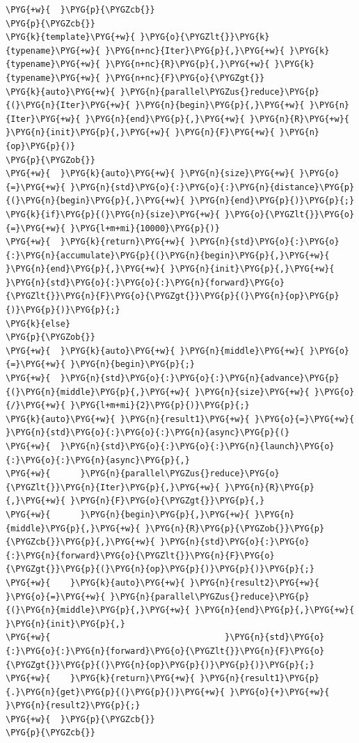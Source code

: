 \begin{codeblockbg}
\begin{Verbatim}[commandchars=\\\{\},breaklines=true,breakanywhere=true,fontsize=\codefont,xleftmargin=17bp]
\PYG{+w}{  }\PYG{p}{\PYGZcb{}}
\PYG{p}{\PYGZcb{}}
\PYG{k}{template}\PYG{+w}{ }\PYG{o}{\PYGZlt{}}\PYG{k}{typename}\PYG{+w}{ }\PYG{n+nc}{Iter}\PYG{p}{,}\PYG{+w}{ }\PYG{k}{typename}\PYG{+w}{ }\PYG{n+nc}{R}\PYG{p}{,}\PYG{+w}{ }\PYG{k}{typename}\PYG{+w}{ }\PYG{n+nc}{F}\PYG{o}{\PYGZgt{}}
\PYG{k}{auto}\PYG{+w}{ }\PYG{n}{parallel\PYGZus{}reduce}\PYG{p}{(}\PYG{n}{Iter}\PYG{+w}{ }\PYG{n}{begin}\PYG{p}{,}\PYG{+w}{ }\PYG{n}{Iter}\PYG{+w}{ }\PYG{n}{end}\PYG{p}{,}\PYG{+w}{ }\PYG{n}{R}\PYG{+w}{ }\PYG{n}{init}\PYG{p}{,}\PYG{+w}{ }\PYG{n}{F}\PYG{+w}{ }\PYG{n}{op}\PYG{p}{)}
\PYG{p}{\PYGZob{}}
\PYG{+w}{  }\PYG{k}{auto}\PYG{+w}{ }\PYG{n}{size}\PYG{+w}{ }\PYG{o}{=}\PYG{+w}{ }\PYG{n}{std}\PYG{o}{:}\PYG{o}{:}\PYG{n}{distance}\PYG{p}{(}\PYG{n}{begin}\PYG{p}{,}\PYG{+w}{ }\PYG{n}{end}\PYG{p}{)}\PYG{p}{;}
\PYG{k}{if}\PYG{p}{(}\PYG{n}{size}\PYG{+w}{ }\PYG{o}{\PYGZlt{}}\PYG{o}{=}\PYG{+w}{ }\PYG{l+m+mi}{10000}\PYG{p}{)}
\PYG{+w}{  }\PYG{k}{return}\PYG{+w}{ }\PYG{n}{std}\PYG{o}{:}\PYG{o}{:}\PYG{n}{accumulate}\PYG{p}{(}\PYG{n}{begin}\PYG{p}{,}\PYG{+w}{ }\PYG{n}{end}\PYG{p}{,}\PYG{+w}{ }\PYG{n}{init}\PYG{p}{,}\PYG{+w}{ }\PYG{n}{std}\PYG{o}{:}\PYG{o}{:}\PYG{n}{forward}\PYG{o}{\PYGZlt{}}\PYG{n}{F}\PYG{o}{\PYGZgt{}}\PYG{p}{(}\PYG{n}{op}\PYG{p}{)}\PYG{p}{)}\PYG{p}{;}
\PYG{k}{else}
\PYG{p}{\PYGZob{}}
\PYG{+w}{  }\PYG{k}{auto}\PYG{+w}{ }\PYG{n}{middle}\PYG{+w}{ }\PYG{o}{=}\PYG{+w}{ }\PYG{n}{begin}\PYG{p}{;}
\PYG{+w}{  }\PYG{n}{std}\PYG{o}{:}\PYG{o}{:}\PYG{n}{advance}\PYG{p}{(}\PYG{n}{middle}\PYG{p}{,}\PYG{+w}{ }\PYG{n}{size}\PYG{+w}{ }\PYG{o}{/}\PYG{+w}{ }\PYG{l+m+mi}{2}\PYG{p}{)}\PYG{p}{;}
\PYG{k}{auto}\PYG{+w}{ }\PYG{n}{result1}\PYG{+w}{ }\PYG{o}{=}\PYG{+w}{ }\PYG{n}{std}\PYG{o}{:}\PYG{o}{:}\PYG{n}{async}\PYG{p}{(}
\PYG{+w}{  }\PYG{n}{std}\PYG{o}{:}\PYG{o}{:}\PYG{n}{launch}\PYG{o}{:}\PYG{o}{:}\PYG{n}{async}\PYG{p}{,}
\PYG{+w}{      }\PYG{n}{parallel\PYGZus{}reduce}\PYG{o}{\PYGZlt{}}\PYG{n}{Iter}\PYG{p}{,}\PYG{+w}{ }\PYG{n}{R}\PYG{p}{,}\PYG{+w}{ }\PYG{n}{F}\PYG{o}{\PYGZgt{}}\PYG{p}{,}
\PYG{+w}{      }\PYG{n}{begin}\PYG{p}{,}\PYG{+w}{ }\PYG{n}{middle}\PYG{p}{,}\PYG{+w}{ }\PYG{n}{R}\PYG{p}{\PYGZob{}}\PYG{p}{\PYGZcb{}}\PYG{p}{,}\PYG{+w}{ }\PYG{n}{std}\PYG{o}{:}\PYG{o}{:}\PYG{n}{forward}\PYG{o}{\PYGZlt{}}\PYG{n}{F}\PYG{o}{\PYGZgt{}}\PYG{p}{(}\PYG{n}{op}\PYG{p}{)}\PYG{p}{)}\PYG{p}{;}
\PYG{+w}{    }\PYG{k}{auto}\PYG{+w}{ }\PYG{n}{result2}\PYG{+w}{ }\PYG{o}{=}\PYG{+w}{ }\PYG{n}{parallel\PYGZus{}reduce}\PYG{p}{(}\PYG{n}{middle}\PYG{p}{,}\PYG{+w}{ }\PYG{n}{end}\PYG{p}{,}\PYG{+w}{ }\PYG{n}{init}\PYG{p}{,}
\PYG{+w}{                                   }\PYG{n}{std}\PYG{o}{:}\PYG{o}{:}\PYG{n}{forward}\PYG{o}{\PYGZlt{}}\PYG{n}{F}\PYG{o}{\PYGZgt{}}\PYG{p}{(}\PYG{n}{op}\PYG{p}{)}\PYG{p}{)}\PYG{p}{;}
\PYG{+w}{    }\PYG{k}{return}\PYG{+w}{ }\PYG{n}{result1}\PYG{p}{.}\PYG{n}{get}\PYG{p}{(}\PYG{p}{)}\PYG{+w}{ }\PYG{o}{+}\PYG{+w}{ }\PYG{n}{result2}\PYG{p}{;}
\PYG{+w}{  }\PYG{p}{\PYGZcb{}}
\PYG{p}{\PYGZcb{}}
\end{Verbatim}
\end{codeblockbg}


